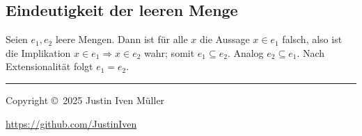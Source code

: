\documentclass[10pt,landscape]{article}
\begin{document}
\begin{multicols*}{4}
\section{Eindeutigkeit der leeren Menge}
Seien \(e_1,e_2\) leere Mengen. Dann ist für alle \(x\) die Aussage \(x\in e_1\) falsch, also ist die Implikation \(x\in e_1\Rightarrow x\in e_2\) wahr; somit \(e_1\subseteq e_2\). Analog \(e_2\subseteq e_1\). Nach Extensionalität folgt \(e_1=e_2\).


\vspace{1cm}

\rule{0.3\linewidth}{0.25pt}
\scriptsize

Copyright \copyright\ 2025 Justin Iven Müller

\href{https://github.com/JustinIven}{https://github.com/JustinIven}


\end{multicols*}
\end{document}
